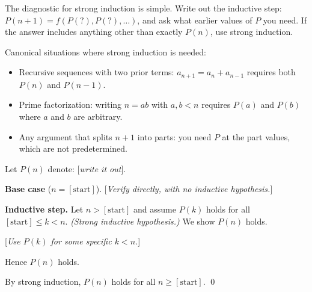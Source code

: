 \begin{remark}
The diagnostic for strong induction is simple. Write out the inductive
step: $P(n+1) = f(P(?), P(?), \ldots)$, and ask what earlier values
of $P$ you need. If the answer includes anything other than exactly $P(n)$,
use strong induction.

Canonical situations where strong induction is needed:
\begin{itemize}[itemsep=2pt]
  \item Recursive sequences with two prior terms: $a_{n+1} = a_n + a_{n-1}$
    requires both $P(n)$ and $P(n-1)$.
  \item Prime factorization: writing $n = ab$ with $a, b < n$
    requires $P(a)$ and $P(b)$ where $a$ and $b$ are arbitrary.
  \item Any argument that splits $n+1$ into parts: you need $P$ at the
    part values, which are not predetermined.
\end{itemize}
\end{remark}

\begin{tcolorbox}[colback=gray!4, colframe=gray!35, arc=2pt,
  left=6pt, right=6pt, top=4pt, bottom=4pt,
  title={\small\textbf{Template: Strong Induction Proof}},
  fonttitle=\small\bfseries]
Let $P(n)$ denote: [\emph{write it out}].

\medskip
\noindent\textbf{Base case} ($n = [\text{start}]$).
[\emph{Verify directly, with no inductive hypothesis.}]

\medskip
\noindent\textbf{Inductive step.}
Let $n > [\text{start}]$ and assume $P(k)$ holds for all
$[\text{start}] \leq k < n$.
\textit{(Strong inductive hypothesis.)}
We show $P(n)$ holds.

[\emph{Use $P(k)$ for some specific $k < n$.}]

Hence $P(n)$ holds.

By strong induction, $P(n)$ holds for all $n \geq [\text{start}]$. \qed
\end{tcolorbox}

